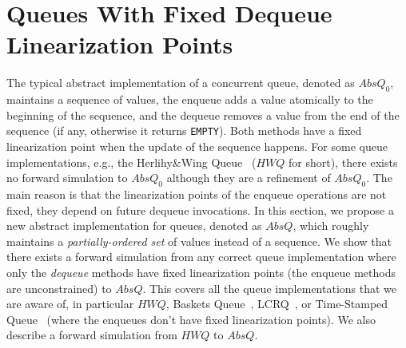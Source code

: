 \vspace{-3.5mm}
\section{Queues With Fixed Dequeue Linearization Points}\label{sec:queues}
\vspace{-1.5mm}
The typical abstract implementation of a concurrent queue, denoted as $AbsQ_0$, maintains a sequence of values, the enqueue adds a value atomically to the beginning of the sequence, and the dequeue removes a value from the end of the sequence (if any, otherwise it returns {\tt EMPTY}). Both methods have a fixed linearization point when the update of the sequence happens. %
For some queue implementations, e.g., the Herlihy\&Wing Queue~\cite{journals/toplas/HerlihyW90} ($\mathit{HWQ}$ for short), there exists no forward simulation to $AbsQ_0$ although they are a refinement of $AbsQ_0$. The main reason is that the linearization points of the enqueue operations are not fixed, they depend on future dequeue invocations. 
In this section, we propose a new abstract implementation for queues, denoted as $AbsQ$, which roughly maintains a \emph{partially-ordered set} of values instead of a sequence. We show that there exists a forward simulation from any correct queue implementation where only the \emph{dequeue} methods have fixed linearization points (the enqueue methods are unconstrained) to $AbsQ$. This covers all the queue implementations that we are aware of, in particular $\mathit{HWQ}$, Baskets Queue~\cite{DBLP:conf/opodis/HoffmanSS07}, LCRQ~\cite{DBLP:conf/ppopp/MorrisonA13}, or Time-Stamped Queue~\cite{DBLP:conf/popl/DoddsHK15} (where the enqueues don't have fixed linearization points). 
We also describe a forward simulation from $\mathit{HWQ}$ to $AbsQ$.

\vspace{-3.5mm}
